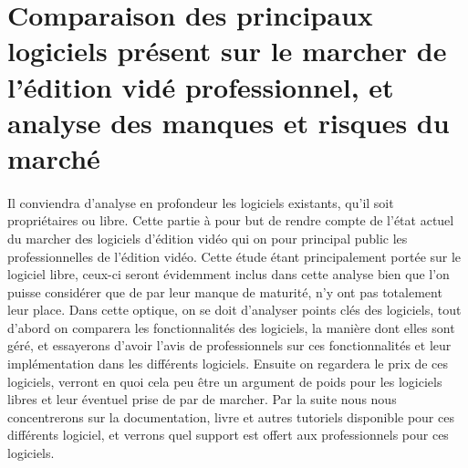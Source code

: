 \newpage
\section{Comparaison des principaux logiciels présent sur le marcher de
l'édition vidé professionnel, et analyse des manques et risques du marché}

\paragraph{}
  Il conviendra d'analyse en profondeur les logiciels existants, qu'il soit
  propriétaires ou libre. Cette partie à pour but de rendre compte de
  l'état actuel du marcher des logiciels d'édition vidéo qui on pour principal
  public les professionnelles de l'édition vidéo. Cette étude étant principalement portée
  sur le logiciel libre, ceux-ci seront évidemment inclus dans cette analyse
  bien que l'on puisse considérer que de par leur manque de maturité,
  n'y ont pas totalement leur place. Dans cette optique, on se doit d'analyser
  points clés des logiciels, tout d'abord on comparera les fonctionnalités des
  logiciels, la manière dont elles sont géré, et essayerons d'avoir l'avis de
  professionnels sur ces fonctionnalités et leur implémentation dans les différents
  logiciels. Ensuite on regardera le prix de ces logiciels, verront en quoi cela
  peu être un argument de poids pour les logiciels libres et leur éventuel
  prise de par de marcher. Par la suite nous nous concentrerons sur la documentation,
  livre et autres tutoriels disponible pour ces différents logiciel, et verrons
  quel support est offert aux professionnels pour ces logiciels.

